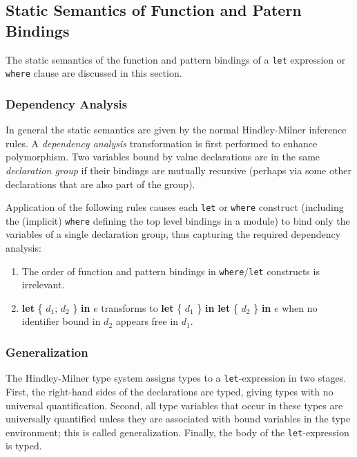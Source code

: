 \subsection{Static Semantics of Function and Patern Bindings} \label{letsemantics}

The static semantics of the function and pattern bindings of a \texttt{let} expression or \texttt{where} clause are discussed in this section.

\subsubsection{Dependency Analysis} \label{declgroup}

In general the static semantics are given by the normal Hindley-Milner inference rules.
A \emph{dependency analysis} transformation is first performed to enhance polymorphism.
Two variables bound by value declarations are in the same \emph{declaration group} if their bindings are mutually recursive (perhaps via some other declarations that are also part of the group).

Application of the following rules causes each \texttt{let} or \texttt{where} construct (including the (implicit) \texttt{where} defining the top level bindings in a module) to bind only the variables of a single declaration group, thus capturing the required dependency analysis:

\begin{enumerate}
\item The order of function and pattern bindings in \texttt{where}/\texttt{let} constructs is irrelevant.
\item \textbf{let} \{ $d_1$; $d_2$ \} \textbf{in} $e$ transforms to \textbf{let} \{ $d_1$  \} \textbf{in} \textbf{let} \{ $d_2$ \} \textbf{in} $e$ when no identifier bound in $d_2$ appears free in $d_1$.
\end{enumerate}

\subsubsection{Generalization} \label{generalization}

The Hindley-Milner type system assigns types to a \texttt{let}-expression in two stages.
First, the right-hand sides of the declarations are typed, giving types with no universal quantification.
Second, all type variables that occur in these types are universally quantified unless they are associated with bound variables in the type environment; this is called generalization.
Finally, the body of the \texttt{let}-expression is typed.

